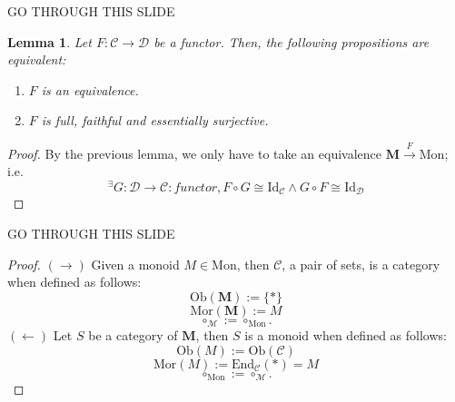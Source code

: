 \documentclass[dvipdfmx,10pt,notheorems]{beamer}
\newtheorem{lemma}[theorem]{Lemma}
\renewcommand{\#}{^\sharp}
\begin{document}
	
	
	\begin{frame}{GO THROUGH THIS SLIDE}
			\begin{lemma}
					Let $F:\mathcal{C}\rightarrow\mathcal{D}$ be a functor. Then, the following propositions are equivalent:
							\begin{enumerate}
									\item $F$ is an equivalence.
									\item $F$ is full, faithful and essentially surjective.
							\end{enumerate}
			\end{lemma}
			\begin{proof}
					By the previous lemma, we only have to take an equivalence
					$\mathbf{M}\overset{F}{\rightarrow}\mathrm{Mon}$; i.e. 
							$$
									{}^\exists G:\mathcal{D}\rightarrow\mathcal{C}:functor,
									F\circ G \cong \mathrm{Id}_{\mathcal{C}} \wedge
									G\circ F \cong \mathrm{Id}_{\mathcal{D}}
							$$
			\end{proof}
	\end{frame}
	


	\begin{frame}{GO THROUGH THIS SLIDE}
			\begin{proof}
							$(\rightarrow)$ Given a monoid $M \in\mathrm{Mon}$, then $\mathcal{C}$, a pair of sets,
							is a category when defined as follows:
							$$
									\mathrm{Ob}(\mathbf{M}):=\{*\}
							$$
							$$
									\mathrm{Mor}(\mathbf{M}):=M
							$$
							$$
									\circ_{\mathcal{M}}:=\circ_{\mathrm{Mon}}.
							$$
							$(\leftarrow)$ Let $S$ be a category of $\mathbf{M}$, then $S$ is a monoid when defined as follows:
							$$
									\mathrm{Ob}(M):=\mathrm{Ob}(\mathcal{C})
							$$
							$$
									\mathrm{Mor}(M):=\mathrm{End}_\mathcal{C}(*)=M
							$$
							$$
									\circ_{\mathrm{Mon}}:=\circ_{\mathcal{M}}.
							$$
			\end{proof}
	\end{frame}
	
	
\end{document}
